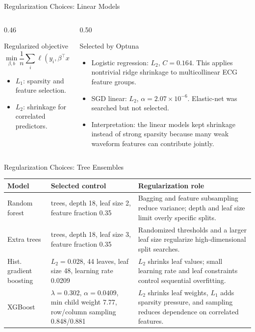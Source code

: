 \documentclass[english, xcolor=dvipsnames, aspectratio=169]{beamer}
\begin{document}
\begin{frame}{Regularization Choices: Linear Models}
\begin{columns}[T,totalwidth=\textwidth]
\begin{column}{0.46\textwidth}
\begin{block}{Regularized objective}
\small
\[
\min_{\beta,b}
\frac{1}{n}\sum_i \ell(y_i,\beta^\top x_i+b)
+\lambda_1\|\beta\|_1+\frac{\lambda_2}{2}\|\beta\|_2^2 .
\]
\begin{itemize}
\item \(L_1\): sparsity and feature selection.
\item \(L_2\): shrinkage for correlated predictors.
\end{itemize}
\end{block}
\end{column}
\begin{column}{0.50\textwidth}
\begin{block}{Selected by Optuna}
\small
\begin{itemize}
\item Logistic regression: \(L_2\), \(C=0.164\). This applies nontrivial ridge shrinkage to multicollinear ECG feature groups.
\item SGD linear: \(L_2\), \(\alpha=2.07{\times}10^{-6}\). Elastic-net was searched but not selected.
\item Interpretation: the linear models kept shrinkage instead of strong sparsity because many weak waveform features can contribute jointly.
\end{itemize}
\end{block}
\end{column}
\end{columns}
\end{frame}

\begin{frame}{Regularization Choices: Tree Ensembles}
\small
\begin{tabular}{@{}p{2.65cm}>{\raggedright\arraybackslash}p{5.0cm}>{\raggedright\arraybackslash}p{5.1cm}@{}}
\toprule
Model & Selected control & Regularization role \\
\midrule
Random forest &
400 trees, depth 18, leaf size 2, feature fraction 0.35 &
Bagging and feature subsampling reduce variance; depth and leaf size limit overly specific splits. \\
Extra trees &
200 trees, depth 18, leaf size 3, feature fraction 0.35 &
Randomized thresholds and a larger leaf size regularize high-dimensional split searches. \\
Hist. gradient boosting &
\(L_2=0.028\), 44 leaves, leaf size 48, learning rate 0.0209 &
\(L_2\) shrinks leaf values; small learning rate and leaf constraints control sequential overfitting. \\
XGBoost &
\(\lambda=0.302\), \(\alpha=0.0409\), min child weight 7.77, row/column sampling 0.848/0.881 &
\(L_2\) shrinks leaf weights, \(L_1\) adds sparsity pressure, and sampling reduces dependence on correlated features. \\
\bottomrule
\end{tabular}
\end{frame}
\end{document}

